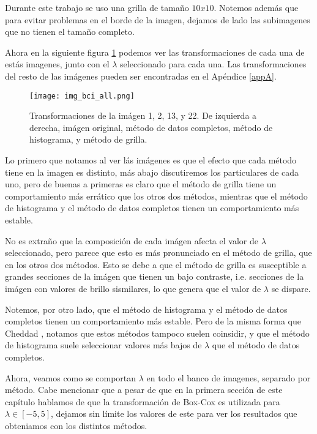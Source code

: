         Durante este trabajo se uso una grilla de tama\~no $10x10$. Notemos adem\'as que para evitar problemas en el borde de la imagen, dejamos de lado las subimagenes que no tienen el tama\~no completo.

    Ahora en la siguiente figura \ref{fig:img_bci_all} podemos ver las transformaciones de cada una de est\'as imagenes, junto con el $\lambda$ seleccionado para cada una. Las transformaciones del resto de las im\'agenes pueden ser encontradas en el Ap\'endice \ref{appA}.


    \begin{figure}[H]
        \centering
        \texttt{[image: img\_bci\_all.png]}
        \caption{Transformaciones de la im\'agen 1, 2, 13, y 22. De izquierda a derecha, im\'agen original, m\'etodo de datos completos, m\'etodo de histograma, y m\'etodo de grilla.}
        \label{fig:img_bci_all}
    \end{figure}


    Lo primero que notamos al ver l\'as im\'agenes es que el efecto que cada m\'etodo tiene en la imagen es distinto, m\'as abajo discutiremos los particulares de cada uno, pero de buenas a primeras es claro que el m\'etodo de grilla tiene un comportamiento m\'as err\'atico que los otros dos m\'etodos, mientras que el m\'etodo de histograma y el m\'etodo de datos completos tienen un comportamiento m\'as estable.

    No es extra\~no que la composici\'on de cada im\'agen afecta el valor de $\lambda$ seleccionado, pero parece que esto es m\'as pronunciado en el m\'etodo de grilla, que en los otros dos m\'etodos. Esto se debe a que el m\'etodo de grilla es susceptible a grandes secciones de la im\'agen que tienen un bajo contraste, i.e. secciones de la im\'agen con valores de brillo sismilares, lo que genera que el valor de $\lambda$ se dispare. 

    Notemos, por otro lado, que el m\'etodo de histograma y el m\'etodo de datos completos tienen un comportamiento m\'as estable. Pero de la misma forma que Cheddad \cite{boxcoximg}, notamos que estos m\'etodos tampoco suelen coinsidir, y que el m\'etodo de histograma suele seleccionar valores m\'as bajos de $\lambda$ que el m\'etodo de datos completos.
    
    Ahora, veamos como se comportan $\lambda$ en todo el banco de imagenes, separado por m\'etodo. Cabe mencionar que a pesar de que  en la primera secci\'on de este cap\'itulo hablamos de que la transformaci\'on de Box-Cox es utilizada para $\lambda\in[-5,5]$, dejamos sin l\'imite los valores de este para ver los resultados que obteniamos con los distintos m\'etodos.

